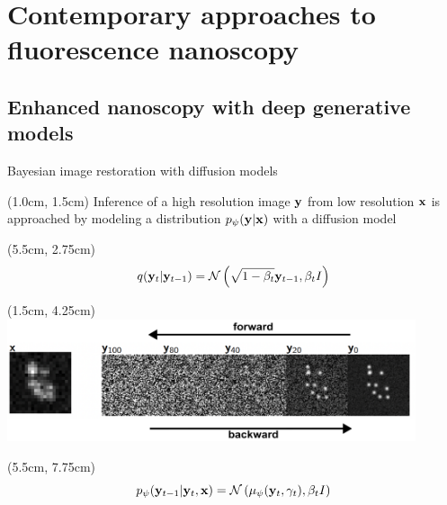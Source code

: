 \documentclass{beamer}					%
\begin{document}

\section{Contemporary approaches to fluorescence nanoscopy}


\subsection{Enhanced nanoscopy with deep generative models}

\begin{frame}{Bayesian image restoration with diffusion models}

\begin{textblock*}{13cm}(1.0cm, 1.5cm)
Inference of a high resolution image $\bold{y}$ from low resolution $\bold{x}$ is approached by modeling a distribution $p_{\psi}(\bold{y}\lvert \bold{x})$ with a diffusion model
\end{textblock*}

\begin{textblock*}{2cm}(5.5cm, 2.75cm)
\begin{equation*}
q(\bold{y}_{t}|\bold{y}_{t-1}) = \mathcal{N}\left(\sqrt{1-\beta_{t}}\bold{y}_{t-1},\beta_t I\right)
\end{equation*}
\end{textblock*}

\begin{textblock*}{12cm}(1.5cm, 4.25cm)
\includegraphics[width=12cm]{../../ddpm/ddpm/media/ForwardBackward.png}
\end{textblock*}

\begin{textblock*}{2cm}(5.5cm, 7.75cm)
\begin{equation*}
p_{\psi}(\bold{y}_{t-1}|\bold{y}_{t},\bold{x}) = \mathcal{N}\left(\mu_{\psi}(\bold{y}_{t},\gamma_{t}),\beta_{t}I\right)
\end{equation*}

\end{textblock*}

\end{frame}
\end{document}

